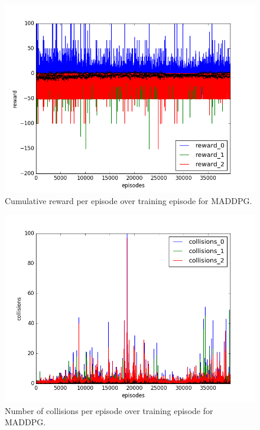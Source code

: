 \begin{figure}[h]
  \centering
  \includegraphics[trim=10 10 10 10,clip,width=\figscale\linewidth]
  {../results/maddpg_2vs1/reward.png}
  \caption{Cumulative reward per episode over training episode for MADDPG.}
  \label{fig:maddpg-2vs1}
\end{figure}
\FloatBarrier


\begin{figure}[h]
  \centering
  \includegraphics[trim=10 10 10 10,clip,width=\figscale\linewidth]
  {../results/maddpg_2vs1/collisions.png}
  \caption{Number of collisions per episode over training episode for MADDPG.}
  \label{fig:maddpg-2vs1}
\end{figure}
\FloatBarrier


